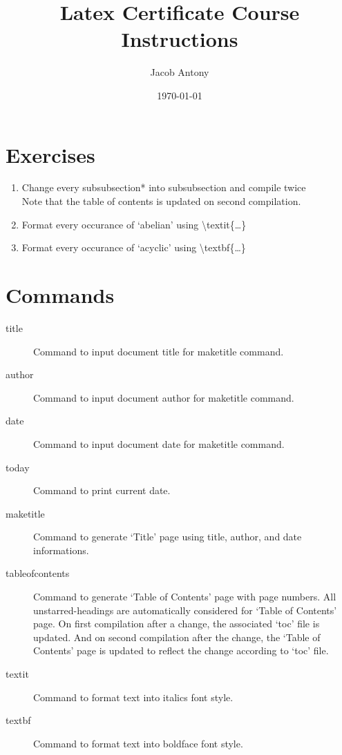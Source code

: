 \documentclass{article}
\title{Latex Certificate Course Instructions}
\author{Jacob Antony}
\date{\today}
\begin{document}
\maketitle

\section{Exercises}
\begin{enumerate}
	\item Change every subsubsection* into subsubsection and compile twice\\
		Note that the table of contents is updated on second compilation. 
	\item Format every occurance of `abelian' using \textbackslash textit\{\dots\}
	\item Format every occurance of `acyclic' using \textbackslash textbf\{\dots\}
\end{enumerate}

\section{Commands}
\begin{description}
	\item[title] Command to input document title for maketitle command.
	\item[author] Command to input document author for maketitle command.
	\item[date] Command to input document date for maketitle command.
	\item[today] Command to print current date.
	\item[maketitle] Command to generate `Title' page using title, author, and date informations.
	\item[tableofcontents] Command to generate `Table of Contents' page with page numbers. All unstarred-headings are automatically considered for `Table of Contents' page. On first compilation after a change, the associated `toc' file is updated. And on second compilation after the change, the `Table of Contents' page is updated to reflect the change according to `toc' file.
	\item[textit] Command to format text into italics font style.
	\item[textbf] Command to format text into boldface font style. 
\end{description}
 
\end{document}
